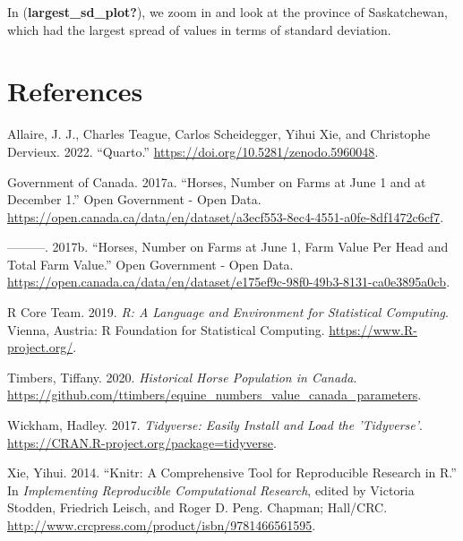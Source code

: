 \documentclass[
  letterpaper,
  DIV=11,
  numbers=noendperiod]{scrartcl}
\newlength{\cslhangindent}
\newenvironment{CSLReferences}[2] %
 {\begin{list}{}{%
  \setlength{\itemindent}{0pt}
  \setlength{\leftmargin}{0pt}
  \setlength{\parsep}{0pt}
  \ifodd #1
   \setlength{\leftmargin}{\cslhangindent}
   \setlength{\itemindent}{-1\cslhangindent}
  \fi
  \setlength{\itemsep}{#2\baselineskip}}}
 {\end{list}}
\begin{document}
In (\textbf{largest\_sd\_plot?}), we zoom in and look at the province of
Saskatchewan, which had the largest spread of values in terms of
standard deviation.

\section*{References}\label{references}

\label{refs}
\begin{CSLReferences}{1}{0}
Allaire, J. J., Charles Teague, Carlos Scheidegger, Yihui Xie, and
Christophe Dervieux. 2022. {``{Quarto}.''}
\url{https://doi.org/10.5281/zenodo.5960048}.

Government of Canada. 2017a. {``Horses, Number on Farms at June 1 and at
December 1.''} Open Government - Open Data.
\url{https://open.canada.ca/data/en/dataset/a3ecf553-8ec4-4551-a0fe-8df1472c6cf7}.

---------. 2017b. {``Horses, Number on Farms at June 1, Farm Value Per
Head and Total Farm Value.''} Open Government - Open Data.
\url{https://open.canada.ca/data/en/dataset/e175ef9c-98f0-49b3-8131-ca0e3895a0cb}.

R Core Team. 2019. \emph{R: A Language and Environment for Statistical
Computing}. Vienna, Austria: R Foundation for Statistical Computing.
\url{https://www.R-project.org/}.

Timbers, Tiffany. 2020. \emph{Historical Horse Population in Canada}.
\url{https://github.com/ttimbers/equine_numbers_value_canada_parameters}.

Wickham, Hadley. 2017. \emph{Tidyverse: Easily Install and Load the
'Tidyverse'}. \url{https://CRAN.R-project.org/package=tidyverse}.

Xie, Yihui. 2014. {``Knitr: A Comprehensive Tool for Reproducible
Research in {R}.''} In \emph{Implementing Reproducible Computational
Research}, edited by Victoria Stodden, Friedrich Leisch, and Roger D.
Peng. Chapman; Hall/CRC.
\url{http://www.crcpress.com/product/isbn/9781466561595}.

\end{CSLReferences}
\end{document}
